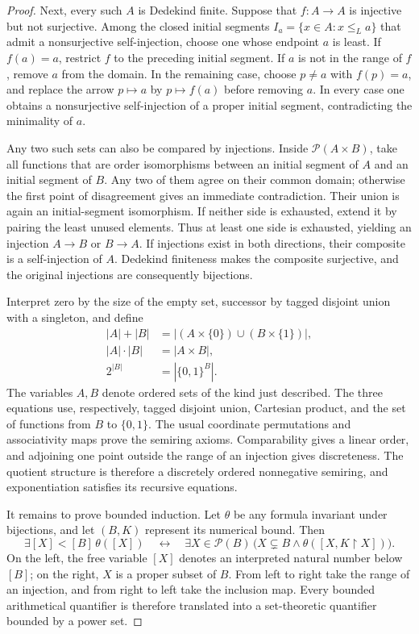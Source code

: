 \documentclass[10pt,a4paper]{amsart}
\begin{document}
\begin{proof}
  Next, every such \(A\) is Dedekind finite. Suppose that \(f:A\to A\) is injective but not surjective. Among the closed initial segments
  \(I_a=\{x\in A:x\leq_La\}\) that admit a nonsurjective self-injection, choose one whose endpoint \(a\) is least. If \(f(a)=a\), restrict \(f\) to the preceding initial segment. If \(a\) is not in the range of \(f\), remove \(a\) from the domain. In the remaining case, choose \(p\neq a\) with \(f(p)=a\), and replace the arrow \(p\mapsto a\) by \(p\mapsto f(a)\) before removing \(a\). In every case one obtains a nonsurjective self-injection of a proper initial segment, contradicting the minimality of \(a\).

  Any two such sets can also be compared by injections. Inside \(\mathcal P(A\times B)\), take all functions that are order isomorphisms between an initial segment of \(A\) and an initial segment of \(B\). Any two of them agree on their common domain; otherwise the first point of disagreement gives an immediate contradiction. Their union is again an initial-segment isomorphism. If neither side is exhausted, extend it by pairing the least unused elements. Thus at least one side is exhausted, yielding an injection \(A\to B\) or \(B\to A\). If injections exist in both directions, their composite is a self-injection of \(A\). Dedekind finiteness makes the composite surjective, and the original injections are consequently bijections.

  Interpret zero by the size of the empty set, successor by tagged disjoint union with a singleton, and define
  \[
  \begin{aligned}
  |A|+|B|&=|(A\times\{0\})\cup(B\times\{1\})|,\\
  |A|\cdot|B|&=|A\times B|,\\
  2^{|B|}&=|\{0,1\}^{B}|.
  \end{aligned}
  \]
  The variables \(A,B\) denote ordered sets of the kind just described. The three equations use, respectively, tagged disjoint union, Cartesian product, and the set of functions from \(B\) to \(\{0,1\}\). The usual coordinate permutations and associativity maps prove the semiring axioms. Comparability gives a linear order, and adjoining one point outside the range of an injection gives discreteness. The quotient structure is therefore a discretely ordered nonnegative semiring, and exponentiation satisfies its recursive equations.

  It remains to prove bounded induction. Let \(\theta\) be any formula invariant under bijections, and let \((B,K)\) represent its numerical bound. Then
  \[
  \exists [X]<[B]\,\theta([X])
  \quad\longleftrightarrow\quad
  \exists X\in\mathcal P(B)\,
  \bigl(X\subsetneq B\wedge\theta([X,K\!\upharpoonright X])\bigr).
  \]
  On the left, the free variable \([X]\) denotes an interpreted natural number below \([B]\); on the right, \(X\) is a proper subset of \(B\). From left to right take the range of an injection, and from right to left take the inclusion map. Every bounded arithmetical quantifier is therefore translated into a set-theoretic quantifier bounded by a power set.


\end{proof}
\end{document}
